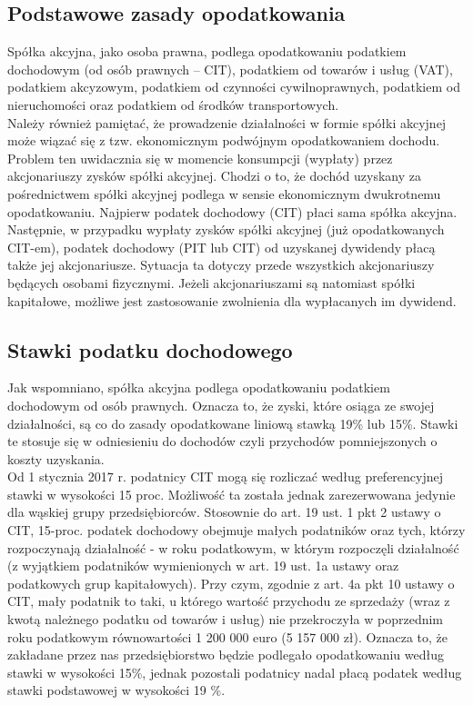\documentclass[11pt]{article}
\begin{document}
	\subsection{Podstawowe zasady opodatkowania}
	Spółka akcyjna, jako osoba prawna, podlega opodatkowaniu podatkiem dochodowym (od osób prawnych – CIT), podatkiem od towarów i usług (VAT), podatkiem akcyzowym, podatkiem od czynności cywilnoprawnych, podatkiem od nieruchomości oraz podatkiem od środków transportowych.\\
	Należy również pamiętać, że prowadzenie działalności w formie spółki akcyjnej może wiązać się z tzw. ekonomicznym podwójnym opodatkowaniem dochodu. Problem ten uwidacznia się w momencie konsumpcji (wypłaty) przez akcjonariuszy zysków spółki akcyjnej. Chodzi o to, że dochód uzyskany za pośrednictwem spółki akcyjnej podlega w sensie ekonomicznym dwukrotnemu opodatkowaniu. Najpierw podatek dochodowy (CIT) płaci sama spółka akcyjna. Następnie, w przypadku wypłaty zysków spółki akcyjnej (już opodatkowanych CIT-em), podatek dochodowy (PIT lub CIT) od uzyskanej dywidendy płacą także jej akcjonariusze. Sytuacja ta dotyczy przede wszystkich akcjonariuszy będących osobami fizycznymi. Jeżeli akcjonariuszami są natomiast spółki kapitałowe, możliwe jest zastosowanie zwolnienia dla wypłacanych im dywidend.
	
	\subsection{Stawki podatku dochodowego}
	
	Jak wspomniano, spółka akcyjna podlega opodatkowaniu podatkiem dochodowym od osób prawnych. Oznacza to, że zyski, które osiąga ze swojej działalności, są co do zasady opodatkowane liniową stawką 19\% lub 15\%. Stawki te stosuje się w odniesieniu do dochodów czyli przychodów pomniejszonych o koszty uzyskania.\\
	Od 1 stycznia 2017 r. podatnicy CIT mogą się rozliczać według preferencyjnej stawki w wysokości 15 proc. Możliwość ta została jednak zarezerwowana jedynie dla wąskiej grupy przedsiębiorców. Stosownie do art. 19 ust. 1 pkt 2 ustawy o CIT, 15-proc. podatek dochodowy obejmuje małych podatników oraz tych, którzy rozpoczynają działalność - w roku podatkowym, w którym rozpoczęli działalność (z wyjątkiem podatników wymienionych w art. 19 ust. 1a ustawy oraz podatkowych grup kapitałowych). Przy czym, zgodnie z art. 4a pkt 10 ustawy o CIT, mały podatnik to taki, u którego wartość przychodu ze sprzedaży (wraz z kwotą należnego podatku od towarów i usług) nie przekroczyła w poprzednim roku podatkowym równowartości 1 200 000 euro (5 157 000 zł). Oznacza to, że zakładane przez nas przedsiębiorstwo będzie podlegało opodatkowaniu według stawki w wysokości 15\%, jednak pozostali podatnicy nadal płacą podatek według stawki podstawowej w wysokości 19 \%.
	
\end{document}
